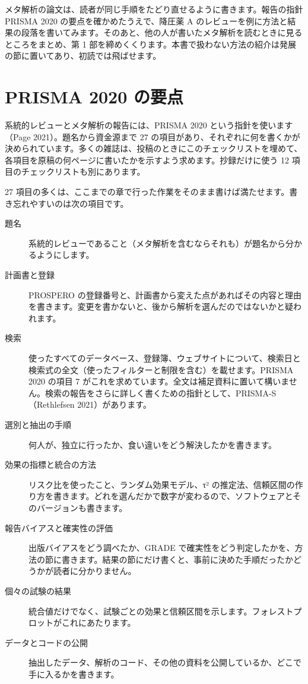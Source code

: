 \begin{chapintro}
メタ解析の論文は、読者が同じ手順をたどり直せるように書きます。報告の指針 PRISMA 2020 の要点を確かめたうえで、降圧薬 A のレビューを例に方法と結果の段落を書いてみます。そのあと、他の人が書いたメタ解析を読むときに見るところをまとめ、第 1 部を締めくくります。本書で扱わない方法の紹介は発展の節に置いてあり、初読では飛ばせます。
\end{chapintro}

\section{PRISMA 2020 の要点}
\label{sec:08-1}

系統的レビューとメタ解析の報告には、PRISMA 2020 という指針を使います（Page 2021）。題名から資金源まで 27 の項目があり、それぞれに何を書くかが決められています。多くの雑誌は、投稿のときにこのチェックリストを埋めて、各項目を原稿の何ページに書いたかを示すよう求めます。抄録だけに使う 12 項目のチェックリストも別にあります。

27 項目の多くは、ここまでの章で行った作業をそのまま書けば満たせます。書き忘れやすいのは次の項目です。

\begin{description}
\item[題名] 系統的レビューであること（メタ解析を含むならそれも）が題名から分かるようにします。
\item[計画書と登録] PROSPERO の登録番号と、計画書から変えた点があればその内容と理由を書きます。変更を書かないと、後から解析を選んだのではないかと疑われます。
\item[検索] 使ったすべてのデータベース、登録簿、ウェブサイトについて、検索日と検索式の全文（使ったフィルターと制限を含む）を載せます。PRISMA 2020 の項目 7 がこれを求めています。全文は補足資料に置いて構いません。検索の報告をさらに詳しく書くための指針として、PRISMA-S（Rethlefsen 2021）があります。
\item[選別と抽出の手順] 何人が、独立に行ったか、食い違いをどう解決したかを書きます。
\item[効果の指標と統合の方法] リスク比を使ったこと、ランダム効果モデル、τ² の推定法、信頼区間の作り方を書きます。どれを選んだかで数字が変わるので、ソフトウェアとそのバージョンも書きます。
\item[報告バイアスと確実性の評価] 出版バイアスをどう調べたか、GRADE で確実性をどう判定したかを、方法の節に書きます。結果の節にだけ書くと、事前に決めた手順だったかどうかが読者に分かりません。
\item[個々の試験の結果] 統合値だけでなく、試験ごとの効果と信頼区間を示します。フォレストプロットがこれにあたります。
\item[データとコードの公開] 抽出したデータ、解析のコード、その他の資料を公開しているか、どこで手に入るかを書きます。
\end{description}

